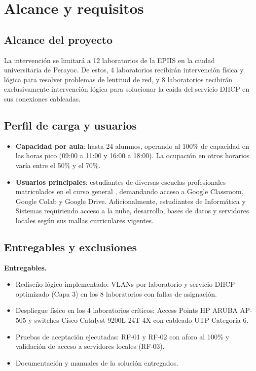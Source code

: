 \section{Alcance y requisitos}

\subsection{Alcance del proyecto}

	La intervención se limitará a 12 laboratorios de la EPIIS en la ciudad universitaria de Perayoc. De estos, 4 laboratorios recibirán intervención física y lógica para resolver problemas de lentitud de red, y 8 laboratorios recibirán exclusivamente intervención lógica para solucionar la caída del servicio DHCP en sus conexiones cableadas.

\subsection{Perfil de carga y usuarios}

	\begin{itemize}
		\item \textbf{Capacidad por aula}: hasta 24 alumnos, operando al 100\% de capacidad en las horas pico (09:00 a 11:00 y 16:00 a 18:00). La ocupación en otros horarios varía entre el 50\% y el 70\%.
		\item \textbf{Usuarios principales}: estudiantes de diversas escuelas profesionales matriculados en el curso general , demandando acceso a Google Classroom, Google Colab y Google Drive. Adicionalmente, estudiantes de Informática y Sistemas requiriendo acceso a la nube, desarrollo, bases de datos y servidores locales según sus mallas curriculares vigentes.
	\end{itemize}

\subsection{Entregables y exclusiones}

	\textbf{Entregables.}

	\begin{itemize}
		\item Rediseño lógico implementado: VLANs por laboratorio y servicio DHCP optimizado (Capa 3) en los 8 laboratorios con fallas de asignación.
		\item Despliegue físico en los 4 laboratorios críticos: Access Points HP ARUBA AP-505 y switches Cisco Catalyst 9200L-24T-4X con cableado UTP Categoría 6.
		\item Pruebas de aceptación ejecutadas: RF-01 y RF-02 con aforo al 100\% y validación de acceso a servidores locales (RF-03).
		\item Documentación y manuales de la solución entregados.
	\end{itemize}

